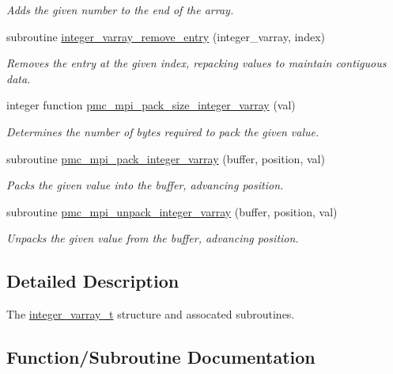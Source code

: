 \begin{DoxyCompactItemize}
\begin{DoxyCompactList}\small\item\em Adds the given number to the end of the array. \end{DoxyCompactList}\item 
subroutine \mbox{\hyperlink{namespacepmc__integer__varray_a1a230c2b3f0b3c7374c02a9ddafed40b}{integer\+\_\+varray\+\_\+remove\+\_\+entry}} (integer\+\_\+varray, index)
\begin{DoxyCompactList}\small\item\em Removes the entry at the given index, repacking values to maintain contiguous data. \end{DoxyCompactList}\item 
integer function \mbox{\hyperlink{namespacepmc__integer__varray_a81d1258f19bf83286f41a25913d87094}{pmc\+\_\+mpi\+\_\+pack\+\_\+size\+\_\+integer\+\_\+varray}} (val)
\begin{DoxyCompactList}\small\item\em Determines the number of bytes required to pack the given value. \end{DoxyCompactList}\item 
subroutine \mbox{\hyperlink{namespacepmc__integer__varray_a4983f303a12ec1ff340ff2f2b738ed4d}{pmc\+\_\+mpi\+\_\+pack\+\_\+integer\+\_\+varray}} (buffer, position, val)
\begin{DoxyCompactList}\small\item\em Packs the given value into the buffer, advancing position. \end{DoxyCompactList}\item 
subroutine \mbox{\hyperlink{namespacepmc__integer__varray_a1cbb70e367cc28d2b7ee33490466f3ff}{pmc\+\_\+mpi\+\_\+unpack\+\_\+integer\+\_\+varray}} (buffer, position, val)
\begin{DoxyCompactList}\small\item\em Unpacks the given value from the buffer, advancing position. \end{DoxyCompactList}\end{DoxyCompactItemize}


\subsection{Detailed Description}
The \mbox{\hyperlink{structpmc__integer__varray_1_1integer__varray__t}{integer\+\_\+varray\+\_\+t}} structure and assocated subroutines. 

\subsection{Function/\+Subroutine Documentation}
\mbox{\label{namespacepmc__integer__varray_af69220e955a17e34968b502ba58301e0}} 
